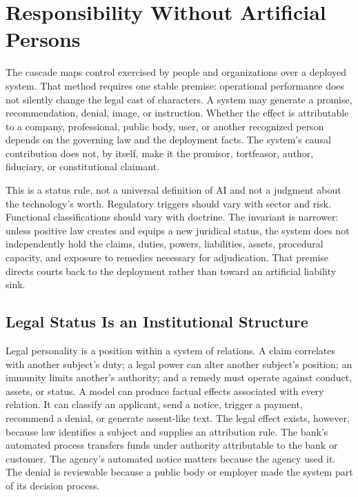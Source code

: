 \section{Responsibility Without Artificial Persons}
\label{sec:definitions}

The cascade maps control exercised by people and organizations over a deployed system. That method requires one stable premise: operational performance does not silently change the legal cast of characters. A system may generate a promise, recommendation, denial, image, or instruction. Whether the effect is attributable to a company, professional, public body, user, or another recognized person depends on the governing law and the deployment facts. The system's causal contribution does not, by itself, make it the promisor, tortfeasor, author, fiduciary, or constitutional claimant.

This is a status rule, not a universal definition of AI and not a judgment about the technology's worth. Regulatory triggers should vary with sector and risk. Functional classifications should vary with doctrine. The invariant is narrower: unless positive law creates and equips a new juridical status, the system does not independently hold the claims, duties, powers, liabilities, assets, procedural capacity, and exposure to remedies necessary for adjudication. That premise directs courts back to the deployment rather than toward an artificial liability sink.

\subsection{Legal Status Is an Institutional Structure}

Legal personality is a position within a system of relations. A claim correlates with another subject's duty; a legal power can alter another subject's position; an immunity limits another's authority; and a remedy must operate against conduct, assets, or status. A model can produce factual effects associated with every relation. It can classify an applicant, send a notice, trigger a payment, recommend a denial, or generate assent-like text. The legal effect exists, however, because law identifies a subject and supplies an attribution rule. The bank's automated process transfers funds under authority attributable to the bank or customer. The agency's automated notice matters because the agency used it. The denial is reviewable because a public body or employer made the system part of its decision process.

